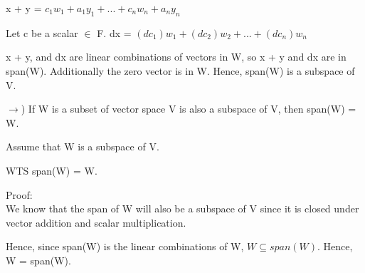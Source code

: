 \documentclass[12pt]{article}
\begin{document}
\begin{enumerate}
    x + y = $c_1w_1 + a_1y_1 + ... + c_nw_n + a_ny_n$

    Let c be a scalar $\in$ F. 
    dx = $(dc_1)w_1 + (dc_2)w_2 + ... + (dc_n)w_n$ 

    x + y, and dx are linear combinations of vectors in W, so x + y and dx are in span(W). Additionally the zero vector is in W. Hence, span(W) is a subspace of V. 
    
    
    
    $\rightarrow$) If W is a subset of vector space V is also a subspace of V, then span(W) = W. 

    Assume that W is a subspace of V.  

    WTS span(W) = W.
    
    Proof: \\ We know that the span of W will also be a subspace of V since it is closed under vector addition and scalar multiplication. 

    Hence, since span(W) is the linear combinations of W, $W \subseteq span(W)$. 
    Hence, W = span(W). 

    \qedsymbol{}
    
\end{enumerate}
\end{document}
